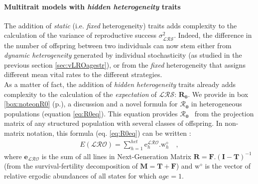 \documentclass[10pt,a4paper]{article}
\newcommand{\Rzero}{$\boldsymbol{\mathcal{R}_{0}}$  }
\newcommand{\LRO}{$\mathcal{LRS}$}
\newcommand{\vLRO}{$\sigma_{\mathrm{\mathcal{LRS}}}^2$}
\begin{document}
\paragraph{Multitrait models with \emph{hidden heterogeneity} traits} 
\label{sec:varlrohet}
The addition of \emph{static} (i.e. \emph{fixed} heterogeneity) traits adds complexity to the calculation of the variance of reproductive success \vLRO. Indeed, the difference in the number of offspring between two individuals can now stem either from \emph{dynamic heterogeneity} generated by individual stochasticity (as studied in the previous section \ref{sec:vLROagestr}), or from the \emph{fixed} heterogeneity that assigns different mean vital rates to the different strategies. \\

As a matter of fact, the addition of \emph{hidden heterogeneity} traits already adds complexity to the calculation of the \emph{expectation} of \LRO: $\mathbf{R_{0}}$. We provide in box \ref{box:noteonR0} (p.\pageref{box:noteonR0}), a discussion and a novel formula for \Rzero in heterogeneous populations (equation \ref{eq:R0eq}). This equation provides \Rzero\ from the projection matrix of any structured population with several classes of offspring. %
In non-matrix notation, this formula (eq. \ref{eq:R0eq}) can be written :
\begin{eqnarray}
E(\mathcal{LRO})=\sum_{h=1}^{het}\mathrm{e}^{\mathcal{LRO}}_{h}.\mathrm{w}^{\diamond}_{h} \quad,
\label{eq:ELRO}
\end{eqnarray}
where 
$\mathbf{e}_{\mathcal{LRO}}$ is the sum of all lines in Next-Generation Matrix $\mathbf{R}=\mathbf{F}.(\mathbf{I}-\mathbf{T})^{-1}$ (from the survival-fertility decomposition of $\mathbf{M}=\mathbf{T}+\mathbf{F}$) and  $\mathrm{w}^{\diamond}$ is the vector of relative ergodic abundances of all states for which $age=1$.\\
\end{document}
